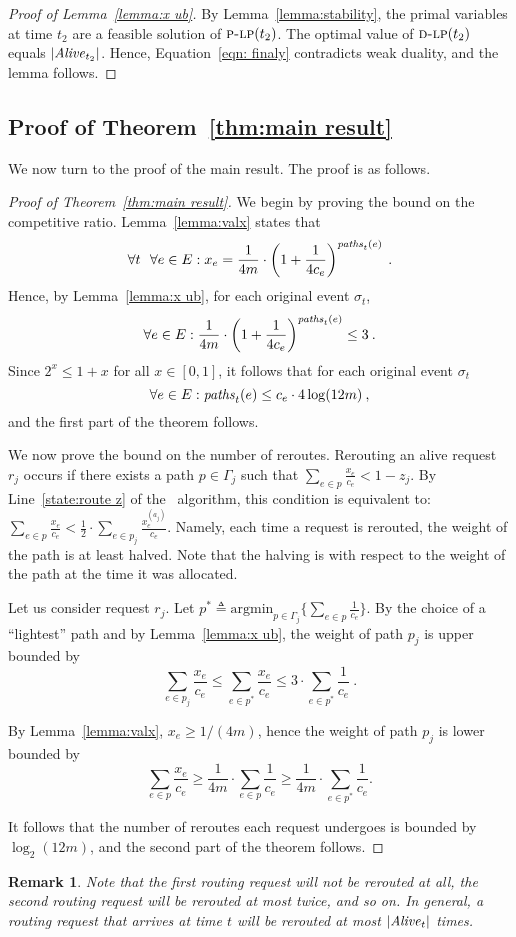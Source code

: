 \documentclass[11pt]{article}
\newenvironment{proof sketch}[1]{\noindent {\emph{Proof sketch of #1:}}}{\hfill \qed}
\newtheorem{rem}{Remark}
\newcommand{\eqdf}{\triangleq}
\newcommand{\dlp}{\textsc{d-lp}}
\newcommand{\plp}{\textsc{p-lp}}
\newcommand{\TSJ}{a_j}
\newcommand{\alive}{\text{\textit{Alive}}}
\newcommand{\paths}{\text{\textit{paths}}_t}
\newcommand{\routealg}{\text{\textsc{Route}}}
\begin{document}
\begin{proof}[Proof of Lemma~\ref{lemma:x ub}]
    By Lemma~\ref{lemma:stability}, the primal variables at time $t_2$
    are a feasible solution of $\plp(t_2)$.  The optimal value of
    $\dlp(t_2)$ equals $|\alive_{t_2}|$.  Hence, Equation~\ref{eqn:
      finaly} contradicts weak duality, and the lemma follows.
\end{proof}
\subsection{Proof of Theorem~\ref{thm:main result}}\label{sec:main}
We now turn to the proof of the main result.
The proof is as follows.

\begin{proof}[Proof of Theorem~\ref{thm:main result}]
We begin by proving the bound on the competitive ratio.
    Lemma~\ref{lemma:valx} states that
    \[
        \forall t  ~~\forall e\in E : x_e = \frac{1}{4m}\cdot \left(1+\frac{1}{4c_e}\right)^{\paths(e)}\:.
    \]
    Hence, by Lemma~\ref{lemma:x ub}, for each original event $\sigma_t$,
    \[
        \forall e\in E : \frac{1}{4m}\cdot \left(1+\frac{1}{4c_e}\right)^{\paths(e)} \leq 3\:.
    \]
    Since $2^x \leq 1 + x$ for all $x \in [0,1]$, it follows that for each original event $\sigma_t$
    \[
\forall e\in E : \paths(e) \leq c_e \cdot 4 \log(12m)\:,
    \]
    and the first part of the theorem follows.

\medskip
\noindent
We now prove the bound on the number of reroutes.  Rerouting an alive
request $r_j$ occurs if there exists a path $p \in \Gamma_j$ such that
$\sum_{e\in p}\frac{x_{e}}{c_e} < 1-z_j$.  By Line~\ref{state:route z}
of the \routealg\ algorithm, this condition is equivalent to:
$\sum_{e\in p}\frac{x_{e}}{c_e} < \frac{1}{2}\cdot \sum_{e\in
  p_j}\frac{x_{e}^{(\TSJ)}}{c_e}$.  Namely, each time a request is
rerouted, the weight of the path is at least halved.
Note that the halving is with respect to the weight of the path at the time it was allocated.

Let us consider request $r_j$. Let $p^* \eqdf \text{argmin}_{p\in \Gamma_j}\{\sum_{e\in p}\frac{1}{c_e}\}$.
By the choice of a ``lightest'' path and by Lemma~\ref{lemma:x ub}, the weight of path $p_j$ is upper bounded by
\[
\sum_{e\in p_j} \frac{x_e}{c_e} \leq \sum_{e\in p^*} \frac{x_e}{c_e} \leq 3 \cdot \sum_{e\in p^*} \frac{1}{c_e}\:.
\]

By Lemma~\ref{lemma:valx}, $x_e \geq 1/(4m)$, hence the weight of path $p_j$ is lower bounded by
\[
\sum_{e\in p} \frac{x_e}{c_e} \geq \frac {1}{4m} \cdot \sum_{e\in p} \frac{1}{c_e} \geq \frac {1}{4m} \cdot\sum_{e\in p^*} \frac{1}{c_e}.
\]

It follows that the number of reroutes each request undergoes is bounded by
$\log_2 \left( 12 m\right)$,
and the second part of the theorem follows.
\end{proof}
\begin{rem}
  Note that the first routing request will not be rerouted at all, the second routing request will be rerouted at most twice, and so on.
  In general, a routing request that arrives at time $t$ will be rerouted at most $|\alive_t|$ times.
\end{rem}
\end{document}
